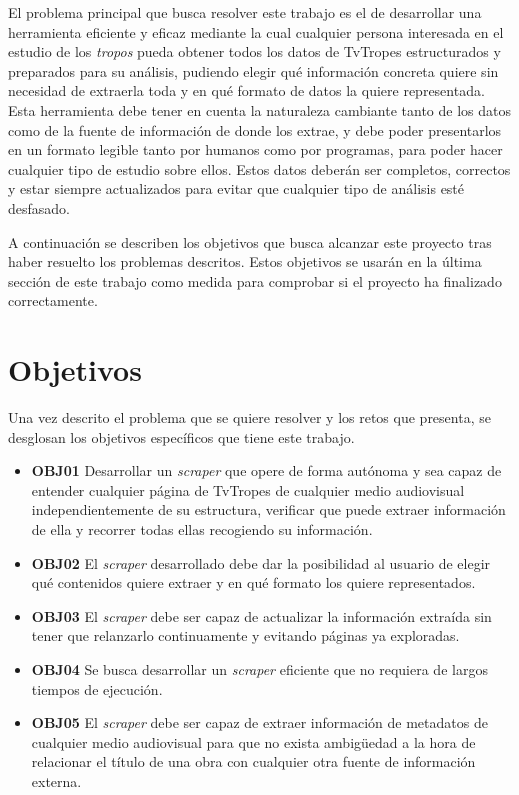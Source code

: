 El problema principal que busca resolver este trabajo es el de desarrollar una
herramienta eficiente y eficaz mediante la cual cualquier persona interesada en
el estudio de los \textit{tropos} pueda obtener todos los datos de TvTropes
estructurados y preparados para su análisis, pudiendo elegir qué información
concreta quiere sin necesidad de extraerla toda y en qué formato de datos la
quiere representada. Esta herramienta debe tener en cuenta la naturaleza
cambiante tanto de los datos como de la fuente de información de donde los
extrae, y debe poder presentarlos en un formato legible tanto por humanos como
por programas, para poder hacer cualquier tipo de estudio sobre ellos. Estos
datos deberán ser completos, correctos y estar siempre actualizados para evitar
que cualquier tipo de análisis esté desfasado.

A continuación se describen los objetivos que busca alcanzar este proyecto tras
haber resuelto los problemas descritos. Estos objetivos se usarán en la última
sección de este trabajo como medida para comprobar si el proyecto ha finalizado
correctamente.

\section{Objetivos}
Una vez descrito el problema que se quiere resolver y los retos que presenta, se
desglosan los objetivos específicos que tiene este trabajo.

\begin{itemize}
    \item \textbf{OBJ01} Desarrollar un \textit{scraper} que opere de forma
    autónoma y sea capaz de entender cualquier página de TvTropes de cualquier
    medio audiovisual independientemente de su estructura, verificar que puede
    extraer información de ella y recorrer todas ellas recogiendo su
    información.
    \item \textbf{OBJ02} El \textit{scraper} desarrollado debe dar la
    posibilidad al usuario de elegir qué contenidos quiere extraer y en qué
    formato los quiere representados. 
    \item \textbf{OBJ03} El \textit{scraper} debe ser capaz de actualizar la
    información extraída sin tener que relanzarlo continuamente y evitando
    páginas ya exploradas.
    \item \textbf{OBJ04} Se busca desarrollar un \textit{scraper} eficiente que
    no requiera de largos tiempos de ejecución.
    \item \textbf{OBJ05} El \textit{scraper} debe ser capaz de extraer
    información de metadatos de cualquier medio audiovisual para que no exista
    ambigüedad a la hora de relacionar el título de una obra con cualquier otra
    fuente de información externa.
\end{itemize}

